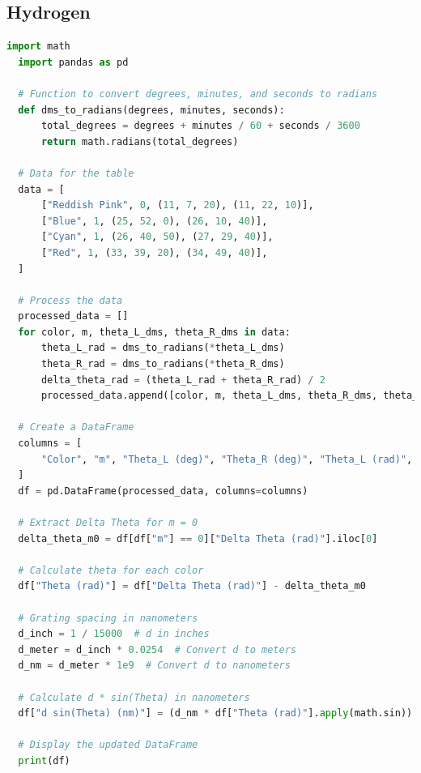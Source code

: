 \documentclass[a4paper,11pt]{article}
\begin{document}
\newpage
%
\subsection*{Hydrogen}
\begin{lstlisting}[language=Python]
  import math
  import pandas as pd
  
  # Function to convert degrees, minutes, and seconds to radians
  def dms_to_radians(degrees, minutes, seconds):
      total_degrees = degrees + minutes / 60 + seconds / 3600
      return math.radians(total_degrees)
  
  # Data for the table
  data = [
      ["Reddish Pink", 0, (11, 7, 20), (11, 22, 10)],
      ["Blue", 1, (25, 52, 0), (26, 10, 40)],
      ["Cyan", 1, (26, 40, 50), (27, 29, 40)],
      ["Red", 1, (33, 39, 20), (34, 49, 40)],
  ]
  
  # Process the data
  processed_data = []
  for color, m, theta_L_dms, theta_R_dms in data:
      theta_L_rad = dms_to_radians(*theta_L_dms)
      theta_R_rad = dms_to_radians(*theta_R_dms)
      delta_theta_rad = (theta_L_rad + theta_R_rad) / 2
      processed_data.append([color, m, theta_L_dms, theta_R_dms, theta_L_rad, theta_R_rad, delta_theta_rad])
  
  # Create a DataFrame
  columns = [
      "Color", "m", "Theta_L (deg)", "Theta_R (deg)", "Theta_L (rad)", "Theta_R (rad)", "Delta Theta (rad)"
  ]
  df = pd.DataFrame(processed_data, columns=columns)
  
  # Extract Delta Theta for m = 0
  delta_theta_m0 = df[df["m"] == 0]["Delta Theta (rad)"].iloc[0]
  
  # Calculate theta for each color
  df["Theta (rad)"] = df["Delta Theta (rad)"] - delta_theta_m0
  
  # Grating spacing in nanometers
  d_inch = 1 / 15000  # d in inches
  d_meter = d_inch * 0.0254  # Convert d to meters
  d_nm = d_meter * 1e9  # Convert d to nanometers
  
  # Calculate d * sin(Theta) in nanometers
  df["d sin(Theta) (nm)"] = (d_nm * df["Theta (rad)"].apply(math.sin)).round(4)
  
  # Display the updated DataFrame
  print(df)
\end{lstlisting}
\end{document}
